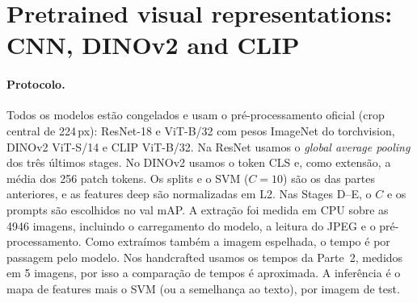 \section{Pretrained visual representations: CNN, DINOv2 and CLIP }
\label{sec:part4}

\paragraph{Protocolo.}
Todos os modelos estão congelados e usam o pré-processamento oficial (crop
central de 224\,px): ResNet-18 e ViT-B/32 com pesos ImageNet do torchvision,
DINOv2 ViT-S/14 e CLIP ViT-B/32. Na ResNet
usamos o \emph{global average pooling} dos três últimos stages. No DINOv2
usamos o token CLS e, como extensão, a média dos 256 patch tokens. Os splits e
o SVM ($C=10$) são os das partes anteriores, e as features deep são
normalizadas em L2. Nas Stages D--E, o $C$ e os prompts são escolhidos no val
mAP. A extração foi medida em CPU sobre as 4946 imagens, incluindo o
carregamento do modelo, a leitura do JPEG e o pré-processamento. Como
extraímos também a imagem espelhada, o tempo é por passagem pelo modelo. Nos
handcrafted usamos os tempos da Parte~2, medidos em 5 imagens, por isso a
comparação de tempos é aproximada. A inferência é o mapa de features mais o
SVM (ou a semelhança ao texto), por imagem de test.

